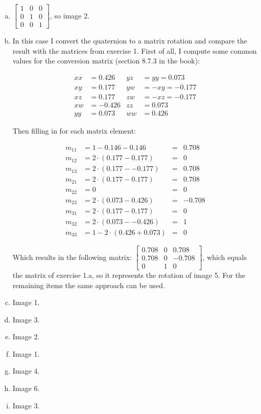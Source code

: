 \documentclass[11pt]{article}
\begin{document}
\begin{enumerate}[a.]
	\item %
	$\begin{bmatrix}
		1 & 0 & 0 \\
		0 & 1 & 0 \\
		0 & 0 & 1
	\end{bmatrix}$, so image 2.
	\item %
		In this case I convert the quaternion to a matrix rotation and compare the result with the matrices from exercise 1. First of all, I compute some common values for the conversion matrix (section 8.7.3 in the book):	
	
		\begin{align*}
			xx&=0.426  &yz&=yy=0.073 \\
			xy&=0.177  &yw&=-xy=-0.177 \\
			xz&=0.177  &zw&=-xz=-0.177 \\
			xw&=-0.426 &zz&=0.073 \\
			yy&=0.073  &ww&=0.426
		\end{align*}

		Then filling in for each matrix element:
		
		\begin{align*}
			m_{11}&=1-0.146-0.146&=&0.708 \\
			m_{12}&=2\cdot(0.177-0.177)&=&0 \\
			m_{13}&=2\cdot(0.177--0.177)&=&0.708 \\
			m_{21}&=2\cdot(0.177-0.177)&=&0.708 \\
			m_{22}&=0&=&0 \\
			m_{23}&=2\cdot(0.073-0.426)&=&-0.708 \\
			m_{31}&=2\cdot(0.177-0.177)&=&0 \\
			m_{32}&=2\cdot(0.073--0.426)&=&1 \\
			m_{33}&=1-2\cdot(0.426+0.073)&=&0
		\end{align*}		
		
		Which results in the following matrix: $\begin{bmatrix}
			0.708 & 0 & 0.708 \\
			0.708 & 0 & -0.708 \\
			0 & 1 & 0
		\end{bmatrix}$, which equals the matrix of exercise 1.a, so it represents the rotation of image 5. For the remaining items the same approach can be used.
	\item %
	Image 1.
	\item %
	Image 3.
	\item %
	Image 2.
	\item %
	Image 1.
	\item %
	Image 4.
	\item %
	Image 6.
	\item %
	Image 3.
\end{enumerate}
\end{document}
